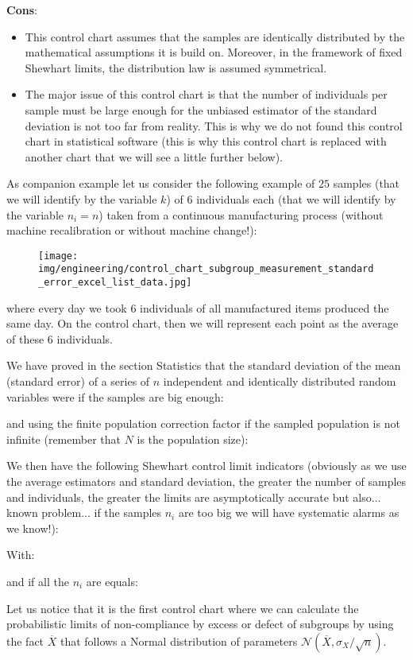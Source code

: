 	\textbf{Cons}:
	\begin{itemize}
		\item This control chart assumes that the samples are identically distributed by the mathematical assumptions it is build on. Moreover, in the framework of fixed Shewhart limits, the distribution law is assumed symmetrical. 
		
		\item  The major issue of this control chart is that the number of individuals per sample must be large enough for the unbiased estimator of the standard deviation is not too far from reality. This is why we do not found this control chart in statistical software (this is why this control chart is replaced with another chart that we will see a little further below).
 	\end{itemize}
 	As companion example let us consider the following example of $25$ samples (that we will identify by the variable $k$) of $6$ individuals each (that we will identify by the variable $n_i=n$) taken from a continuous manufacturing process (without machine recalibration or without machine change!):
 	\begin{figure}[H]
		\centering
		\texttt{[image: img/engineering/control\_chart\_subgroup\_measurement\_standard\_error\_excel\_list\_data.jpg]}
	\end{figure}
	where every day we took $6$ individuals of all manufactured items produced the same day. On the control chart, then we will represent each point as the average of these $6$ individuals.

	We have proved in the section Statistics that the standard deviation of the mean (standard error) of a series of $n$ independent and identically distributed random variables were if the samples are big enough:
	
	and using the finite population correction factor if the sampled population is not infinite (remember that $N$ is the population size):
	 
	We then have the following Shewhart control limit indicators (obviously as we use the average estimators and standard deviation, the greater the number of samples and individuals, the greater the limits are asymptotically accurate but also... known problem... if the samples $n_i$ are too big we will have systematic alarms as we know!):
	
	With:
	
	and if all the $n_i$ are equals:
	
	Let us notice that it is the first control chart where we can calculate the probabilistic limits of non-compliance by excess or defect of subgroups by using the fact $\overline{X}$ that follows a Normal distribution of parameters $\mathcal{N}\left(\overline{X},\sigma_X/\sqrt{n}\right)$.
	
